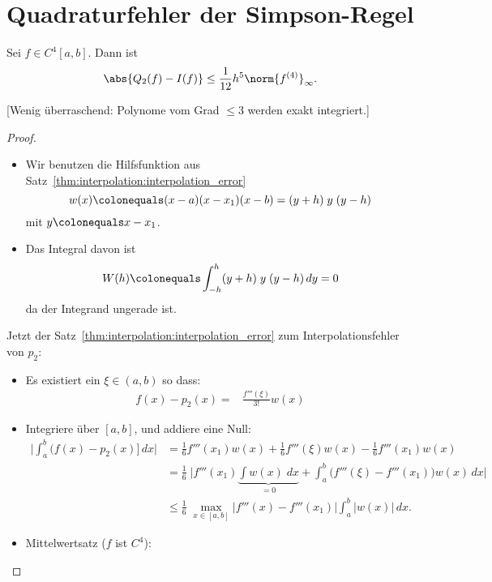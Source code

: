 \section{Quadraturfehler der Simpson-Regel}
\begin{satz}
Sei $f \in C^4[a,b]$. Dann ist
\begin{equation*}
\abs{Q_2(f) - I(f)} \le \frac{1}{12} h^5 \norm{ f^{(4)} }_\infty.
\end{equation*}
\end{satz}
[Wenig überraschend: Polynome vom Grad $\le 3$ werden exakt integriert.]


\begin{proof}
\begin{itemize}
\item Wir benutzen die Hilfsfunktion aus Satz~\ref{thm:interpolation:interpolation_error}
\begin{equation*}
w(x) \colonequals (x-a)(x-x_1)(x-b) = (y+h)\;y\; (y-h)
\end{equation*}
mit $y \colonequals x - x_1$.

 \item Das Integral davon ist
  \begin{equation*}
   W(h) \colonequals \int_{-h}^h (y+h) \;y\; (y-h) \,dy = 0
  \end{equation*}
  da der Integrand ungerade ist.
\end{itemize}

\bigskip

Jetzt der Satz~\ref{thm:interpolation:interpolation_error} zum Interpolationsfehler von $p_2$:
\begin{itemize}
 \item Es existiert ein $\xi \in (a,b)$ so dass:
\begin{align*}
f(x) - p_2(x) = &\frac{f'''(\xi)}{3!} w(x)
\end{align*}
\item Integriere über $[a,b]$, und addiere eine Null:
\begin{align*}
\Big\vert \int_a^b \big(f(x) - p_2(x)\big] \, dx \Big\vert
 &=
 \frac{1}{6} f'''(x_1) w(x) + \frac{1}{6} f'''(\xi) w(x) - \frac{1}{6} f'''(x_1)w(x) \\
 &=
 \frac{1}{6}\; \bigg\vert f'''(x_1) \underbrace{\int w(x) \; dx}_{= 0} + \int_a^b \Big(f'''(\xi) - f'''(x_1)\Big) w(x) \, dx \bigg\vert \\
 & \le
 \frac{1}{6} \; \max_{x \in [a,b]} \Big \vert f'''(x) - f'''(x_1) \Big\vert \int_a^b\vert w(x) \vert \, dx.
\end{align*}
\item Mittelwertsatz ($f$ ist $C^4$):


\end{itemize}
\end{proof}
